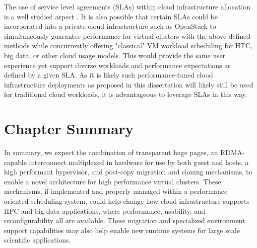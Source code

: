 The use of service level agreements (SLAs) within cloud infrastructure allocation is a well studied aspect \cite{serrano2013towards}.  It is also possible that certain SLAs could be incorporated into a private cloud infrastructure such as OpenStack to simultaneously guarantee performance for virtual clusters with the above defined methods while concurrently offering "classical" VM workload scheduling for HTC, big data, or other cloud usage models. This would provide the same user experience yet support diverse workloads and performance expectations as defined by a given SLA. As it is likely such performance-tuned cloud infrastructure deployments as proposed in this dissertation will likely still be used for traditional cloud workloads, it is advantageous to leverage SLAs in this way.   

 

\section{Chapter Summary}
\label{chap7sum}



In summary, we expect the combination of transparent huge pages, an RDMA-capable interconnect multiplexed in hardware for use by both guest and hosts, a high performant hypervisor, and post-copy migration and cloning mechanisms, to enable a novel architecture for high performance virtual clusters. These mechanisms, if implemented and properly managed within a performance oriented scheduling system, could help change how cloud infrastructure supports HPC and big data applications, where performance, usability, and reconfigurability all are available.  These migration and specialized environment support capabilities may also help enable new runtime systems for large scale scientific applications. 






